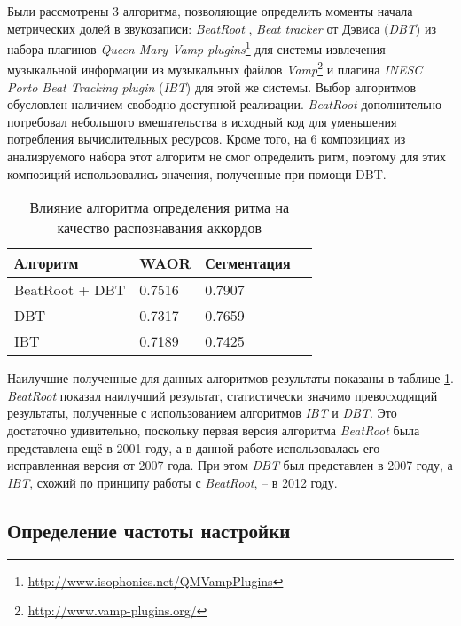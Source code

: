 Были рассмотрены 3 алгоритма, позволяющие определить моменты начала метрических
долей в звукозаписи: \emph{BeatRoot} \cite{Dixon2007}, \emph{Beat tracker} от
Дэвиса \cite{Davies2007} (\emph{DBT}) из набора плагинов \emph{Queen Mary Vamp
plugins}\footnote{\url{http://www.isophonics.net/QMVampPlugins}} для системы
извлечения музыкальной информации из музыкальных файлов
\emph{Vamp}\footnote{\url{http://www.vamp-plugins.org/}} и плагина \emph{INESC
Porto Beat Tracking plugin} \cite{Oliveira2012} (\emph{IBT}) для этой же
системы. Выбор алгоритмов обусловлен наличием свободно доступной реализации.
\emph{BeatRoot} дополнительно потребовал небольшого вмешательства в исходный
код для уменьшения потребления вычислительных ресурсов. Кроме того, на 6
композициях из анализруемого набора этот алгоритм не смог определить ритм,
поэтому для этих композиций использовались значения, полученные при помощи DBT.

\begin{table} [htbp]
  \centering
  \parbox{15cm}{\caption{Влияние алгоритма определения ритма на
  качество распознавания аккордов} \label{TBT}}
  \begin{tabular}{|l|l|l|l|}
  \hline
  Алгоритм & WAOR & Сегментация \\
  \hline
  BeatRoot + DBT & 0.7516 & 0.7907 \\
  DBT & 0.7317 & 0.7659 \\
  IBT & 0.7189 & 0.7425 \\
  \hline
  \end{tabular}
\end{table}

Наилучшие полученные для данных алгоритмов результаты показаны в таблице
\ref{TBT}. \emph{BeatRoot} показал наилучший результат, статистически значимо
превосходящий результаты, полученные с использованием алгоритмов \emph{IBT} и
\emph{DBT}. Это достаточно удивительно, поскольку первая версия алгоритма
\emph{BeatRoot} была представлена ещё в 2001 году, а в данной работе
использовалась его исправленная версия от 2007 года. При этом \emph{DBT} был
представлен в 2007 году, а \emph{IBT}, схожий по принципу работы с
\emph{BeatRoot}, -- в 2012 году.

\subsection{Определение частоты настройки} \label{ssec3_tunfreq}

